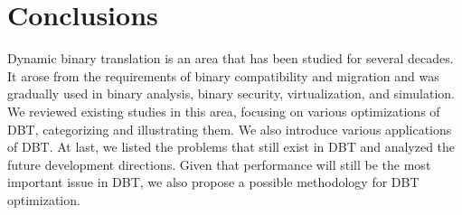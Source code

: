 \section{Conclusions}
\label{sec:conclusions}

Dynamic binary translation is an area that has been studied for several decades.
It arose from the requirements of binary compatibility and migration and was gradually used in binary analysis, binary security, virtualization, and simulation.
We reviewed existing studies in this area, focusing on various optimizations of DBT, categorizing and illustrating them.
We also introduce various applications of DBT.
At last, we listed the problems that still exist in DBT and analyzed the future development directions.
Given that performance will still be the most important issue in DBT, we also propose a possible methodology for DBT optimization.

